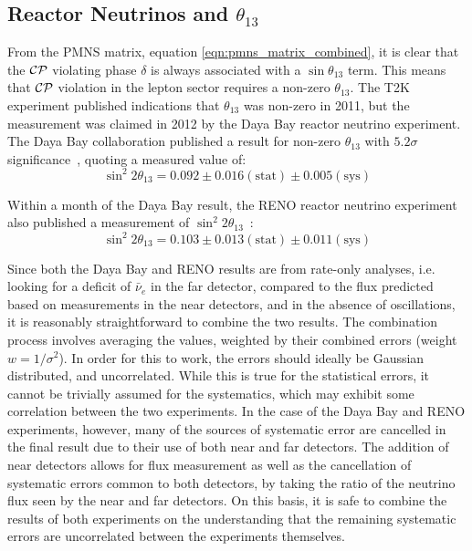 \subsection{Reactor Neutrinos and $\theta_{13}$}
From the PMNS matrix, equation \eqref{eqn:pmns_matrix_combined}, it is clear that the $\mathcal{C}\mathcal{P}$ violating phase $\delta$ is always associated with a $\sin\theta_{13}$ term. This means that $\mathcal{C}\mathcal{P}$ violation in the lepton sector requires a non-zero $\theta_{13}$. The T2K~\citep{Abe2011} experiment published indications that $\theta_{13}$ was non-zero in 2011, but the measurement was claimed in 2012 by the Daya Bay reactor neutrino experiment. The Daya Bay collaboration published a result for non-zero $\theta_{13}$ with $5.2\sigma$ significance~\citep{An2012}, quoting a measured value of:
\begin{equation}\label{eqn:reactor_parameters_dyb}
\sin^2 2\theta_{13} = 0.092 \pm 0.016 (\mathrm{stat}) \pm 0.005 (\mathrm{sys})
\end{equation}

Within a month of the Daya Bay result, the RENO reactor neutrino experiment also published a measurement of $\sin^2 2\theta_{13}$~\citep{Ahn2012}:
\begin{equation}\label{eqn:reactor_parameters_reno}
\sin^2 2\theta_{13} = 0.103 \pm 0.013 (\mathrm{stat}) \pm 0.011 (\mathrm{sys})
\end{equation}

Since both the Daya Bay and RENO results are from rate-only analyses, i.e. looking for a deficit of $\bar{\nu}_e$ in the far detector, compared to the flux predicted based on measurements in the near detectors, and in the absence of oscillations, it is reasonably straightforward to combine the two results. The combination process involves averaging the values, weighted by their combined errors (weight $w = 1/\sigma^2$). In order for this to work, the errors should ideally be Gaussian distributed, and uncorrelated. While this is true for the statistical errors, it cannot be trivially assumed for the systematics, which may exhibit some correlation between the two experiments. In the case of the Daya Bay and RENO experiments, however, many of the sources of systematic error are cancelled in the final result due to their use of both near and far detectors. The addition of near detectors allows for flux measurement as well as the cancellation of systematic errors common to both detectors, by taking the ratio of the neutrino flux seen by the near and far detectors. On this basis, it is safe to combine the results of both experiments on the understanding that the remaining systematic errors are uncorrelated between the experiments themselves.

